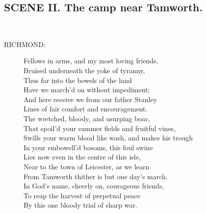 \documentclass{article}
\begin{document}
\subsection*{SCENE II.  The camp near Tamworth.}
\\
\begin{description}
\item[RICHMOND:] 
\hspace{1pt}Fellows in arms, and my most loving friends,\\
\hspace{1pt}Bruised underneath the yoke of tyranny,\\
\hspace{1pt}Thus far into the bowels of the land\\
\hspace{1pt}Have we march'd on without impediment;\\
\hspace{1pt}And here receive we from our father Stanley\\
\hspace{1pt}Lines of fair comfort and encouragement.\\
\hspace{1pt}The wretched, bloody, and usurping boar,\\
\hspace{1pt}That spoil'd your summer fields and fruitful vines,\\
\hspace{1pt}Swills your warm blood like wash, and makes his trough\\
\hspace{1pt}In your embowell'd bosoms, this foul swine\\
\hspace{1pt}Lies now even in the centre of this isle,\\
\hspace{1pt}Near to the town of Leicester, as we learn\\
\hspace{1pt}From Tamworth thither is but one day's march.\\
\hspace{1pt}In God's name, cheerly on, courageous friends,\\
\hspace{1pt}To reap the harvest of perpetual peace\\
\hspace{1pt}By this one bloody trial of sharp war.\\
\end{description}
\end{document}
